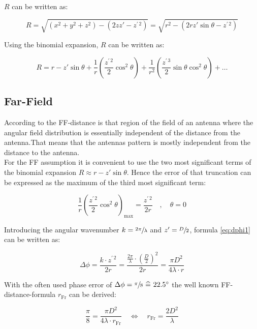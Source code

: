 $R$ can be written as: \cite{balanis}

\begin{equation}
R = \sqrt{\left(x^2+y^2+z^2\right)-\left(2zz'-z^{\prime\, 2}\right)}=\sqrt{r^2-\left(2rz'\sin \theta -z^{\prime\, 2}\right)}
\end{equation}

Using the binomial expansion, $R$ can be written as:

\begin{equation}
R = r - z'\sin\theta + \frac{1}{r}\left(\frac{z^{\prime\, 2}}{2}\cos ^2 \theta\right) + \frac{1}{r^2}\left(\frac{z^{\prime\, 3}}{2}\sin\theta\cos^2\theta\right) + \dots
\end{equation}

\subsection{Far-Field}

According to \cite{balanis} the \ac{FF}-distance is \glqq that region of the field of an antenna where the angular field distribution is essentially independent of the distance from the antenna.\grqq{ }That means that the antennas pattern is mostly independent from the distance to the antenna.\\
For the \ac{FF} assumption it is convenient to use the two most significant terms of the binomial expansion $R\approx r - z'\sin\theta$. Hence the error of that truncation can be expressed as the maximum of the third most significant term:

\begin{equation}
\frac{1}{r}\left(\frac{z^{\prime\, 2}}{2}\cos ^2 \theta\right)_\text{max} = \frac{z^{\prime\, 2}}{2r} \quad , \quad \theta = 0
\label{eq:dphi1}
\end{equation}

Introducing the angular wavenumber $k=\sfrac{2\pi}{\lambda}$ and $z'=\sfrac{D}{2}$, formula \ref{eq:dphi1} can be written as:


\begin{equation}
\Delta\phi = \frac{k\cdot z^{\prime\, 2}}{2r} =\frac{\frac{2\pi}{\lambda}\cdot \left(\frac{D}{2}\right)^2}{2r} = \frac{\pi D^2}{4\lambda\cdot r}
\end{equation}

With the often used phase error of $\Delta\phi = \sfrac{\pi}{8} \ \widehat{=}\  22.5^\circ$ the well known \ac{FF}-distance-formula $r_{\text{Fr}}$ can be derived:

\begin{equation}
\frac{\pi}{8} = \frac{\pi D^2}{4\lambda\cdot r_{\text{Fr}}} \quad \Leftrightarrow \quad r_{\text{Fr}} = \frac{2D^2}{\lambda}
\end{equation}

